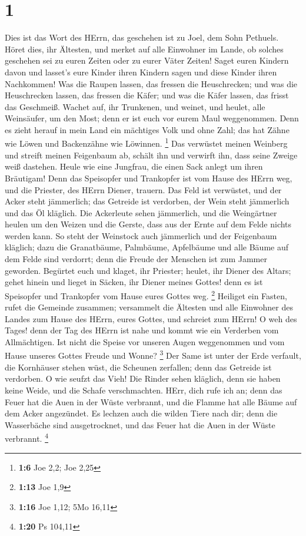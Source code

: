 \hypertarget{section}{%
\section{1}\label{section}}

 Dies ist das Wort des HErrn, das geschehen ist zu Joel, dem
Sohn Pethuels.  Höret dies, ihr Ältesten, und merket auf
alle Einwohner im Lande, ob solches geschehen sei zu euren Zeiten oder
zu eurer Väter Zeiten!  Saget euren Kindern davon und
lasset's eure Kinder ihren Kindern sagen und diese Kinder ihren
Nachkommen!  Was die Raupen lassen, das fressen die
Heuschrecken; und was die Heuschrecken lassen, das fressen die Käfer;
und was die Käfer lassen, das frisst das Geschmeiß.  Wachet
auf, ihr Trunkenen, und weinet, und heulet, alle Weinsäufer, um den
Most; denn er ist euch vor eurem Maul weggenommen.  Denn es
zieht herauf in mein Land ein mächtiges Volk und ohne Zahl; das hat
Zähne wie Löwen und Backenzähne wie Löwinnen. \footnote{\textbf{1:6} Joe
  2,2; Joe 2,25}  Das verwüstet meinen Weinberg und streift
meinen Feigenbaum ab, schält ihn und verwirft ihn, dass seine Zweige
weiß dastehen.  Heule wie eine Jungfrau, die einen Sack
anlegt um ihren Bräutigam!  Denn das Speisopfer und
Trankopfer ist vom Hause des HErrn weg, und die Priester, des HErrn
Diener, trauern.  Das Feld ist verwüstet, und der Acker
steht jämmerlich; das Getreide ist verdorben, der Wein steht jämmerlich
und das Öl kläglich.  Die Ackerleute sehen jämmerlich, und
die Weingärtner heulen um den Weizen und die Gerste, dass aus der Ernte
auf dem Felde nichts werden kann.  So steht der Weinstock
auch jämmerlich und der Feigenbaum kläglich; dazu die Granatbäume,
Palmbäume, Apfelbäume und alle Bäume auf dem Felde sind verdorrt; denn
die Freude der Menschen ist zum Jammer geworden.  Begürtet
euch und klaget, ihr Priester; heulet, ihr Diener des Altars; gehet
hinein und lieget in Säcken, ihr Diener meines Gottes! denn es ist
Speisopfer und Trankopfer vom Hause eures Gottes weg. \footnote{\textbf{1:13}
  Joe 1,9}  Heiliget ein Fasten, rufet die Gemeinde
zusammen; versammelt die Ältesten und alle Einwohner des Landes zum
Hause des HErrn, eures Gottes, und schreiet zum HErrn!  O
weh des Tages! denn der Tag des HErrn ist nahe und kommt wie ein
Verderben vom Allmächtigen.  Ist nicht die Speise vor
unseren Augen weggenommen und vom Hause unseres Gottes Freude und Wonne?
\footnote{\textbf{1:16} Joe 1,12; 5Mo 16,11}  Der Same ist
unter der Erde verfault, die Kornhäuser stehen wüst, die Scheunen
zerfallen; denn das Getreide ist verdorben.  O wie seufzt
das Vieh! Die Rinder sehen kläglich, denn sie haben keine Weide, und die
Schafe verschmachten.  HErr, dich rufe ich an; denn das
Feuer hat die Auen in der Wüste verbrannt, und die Flamme hat alle Bäume
auf dem Acker angezündet.  Es lechzen auch die wilden Tiere
nach dir; denn die Wasserbäche sind ausgetrocknet, und das Feuer hat die
Auen in der Wüste verbrannt. \footnote{\textbf{1:20} Ps 104,11}

